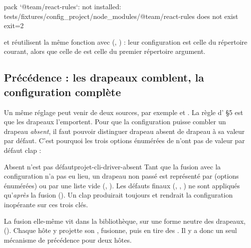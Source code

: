 \begin{sortie}
[error] pack `@team/react-rules`: not installed: tests/fixtures/config_project/node_modules/@team/react-rules does not exist
exit=2
\end{sortie}

 et  réutilisent la même fonction avec  (, ) : leur configuration est celle du répertoire courant, alors que celle de  est celle du premier répertoire argument.

\subsection{Précédence : les drapeaux comblent, la configuration complète}

Un même réglage peut venir de deux sources, par exemple  et . La règle d' §5 est que les drapeaux l'emportent. Pour que la configuration puisse combler un drapeau \emph{absent}, il faut pouvoir distinguer \og drapeau absent\fg{} de \og drapeau à sa valeur par défaut\fg{}. C'est pourquoi les trois options énumérées de  n'ont pas de valeur par défaut clap :


\begin{invariant}{Absent n'est pas défaut}{projet-cli-driver-absent}
Tant que la fusion avec la configuration n'a pas eu lieu, un drapeau non passé est représenté par  (options énumérées) ou par une liste vide (, ). Les défauts finaux (, , ) ne sont appliqués qu'\emph{après} la fusion (). Un  clap produirait toujours  et rendrait la configuration inopérante sur ces trois clés.
\end{invariant}

La fusion elle-même vit dans la bibliothèque, sur une forme neutre des drapeaux,  (). Chaque hôte y projette son , fusionne, puis en tire des . Il y a donc un seul mécanisme de précédence pour deux hôtes.


